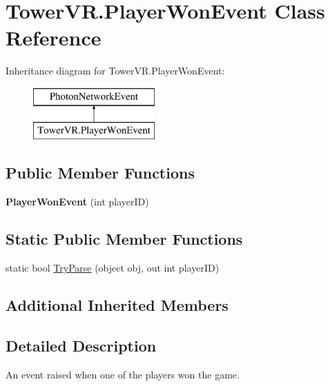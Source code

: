 \hypertarget{class_tower_v_r_1_1_player_won_event}{}\section{Tower\+V\+R.\+Player\+Won\+Event Class Reference}
\label{class_tower_v_r_1_1_player_won_event}
Inheritance diagram for Tower\+V\+R.\+Player\+Won\+Event\+:\begin{figure}[H]
\begin{center}
\leavevmode
\includegraphics[height=2.000000cm]{class_tower_v_r_1_1_player_won_event}
\end{center}
\end{figure}
\subsection*{Public Member Functions}
\begin{DoxyCompactItemize}
\item 
{\bfseries Player\+Won\+Event} (int player\+ID)\hypertarget{class_tower_v_r_1_1_player_won_event_ab32638f596ec8a7586dce0318a5d3239}{}\label{class_tower_v_r_1_1_player_won_event_ab32638f596ec8a7586dce0318a5d3239}

\end{DoxyCompactItemize}
\subsection*{Static Public Member Functions}
\begin{DoxyCompactItemize}
\item 
static bool \hyperlink{class_tower_v_r_1_1_player_won_event_a97ee6f0bf2f5144573a98fd6eca935f2}{Try\+Parse} (object obj, out int player\+ID)
\end{DoxyCompactItemize}
\subsection*{Additional Inherited Members}


\subsection{Detailed Description}
An event raised when one of the players won the game. 

